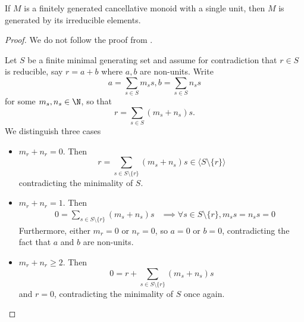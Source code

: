 \begin{proposition}
  \label{0-irred-gen}
  \leanok

  If $M$ is a finitely generated cancellative monoid with a single unit, then $M$ is generated by its irreducible elements.
\end{proposition}
\begin{proof}
  \uses{}
  \leanok

  We do not follow the proof from \cite{Cox_2011}.

  Let $S$ be a finite minimal generating set and assume for contradiction that $r \in S$ is reducible, say $r = a + b$ where $a, b$ are non-units. Write
  \[a = \sum_{s \in S} m_s s, b = \sum_{s \in S} n_s s\]
  for some $m_s, n_s \in \N$, so that
  \[r = \sum_{s \in S} (m_s + n_s) s.\]
  We distinguish three cases
  \begin{itemize}
    \item $m_r + n_r = 0$. Then
    \[r = \sum_{s \in S \setminus \{r\}} (m_s + n_s) s \in \langle S \setminus \{r\}\rangle\]
    contradicting the minimality of $S$.
    \item $m_r + n_r = 1$. Then
    \begin{align*}
      & 0 = \sum_{s \in S \setminus \{r\}} (m_s + n_s) s
      & \implies \forall s \in S \setminus \{r\}, m_s s = n_s s = 0
    \end{align*}
    Furthermore, either $m_r = 0$ or $n_r = 0$, so $a = 0$ or $b = 0$, contradicting the fact that $a$ and $b$ are non-units.
    \item $m_r + n_r \ge 2$. Then
    \[0 = r + \sum_{s \in S \setminus \{r\}} (m_s + n_s) s\]
    and $r = 0$, contradicting the minimality of $S$ once again.
  \end{itemize}
\end{proof}
